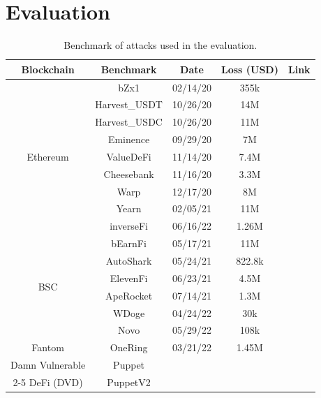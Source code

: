 


\chapter{Evaluation}
\label{sec:evaluation}



\begin{table}[h!]
    \caption{Benchmark of attacks used in the evaluation.}
    \vspace{-2mm}
    \centering
    \begin{tabular}{|c|c|c|c|c|}
    \hline
    Blockchain & Benchmark &  Date  & Loss (USD) & Link \\ \hline
    \multirow{9}{*}{Ethereum}  & bZx1 & 02/14/20 & 355k & \cite{bZx1} \\ \cline{2-5} 
                & Harvest\_USDT & 10/26/20 & 14M & \cite{HarvestUSDC} \\ \cline{2-5} 
                & Harvest\_USDC & 10/26/20 & 11M & \cite{HarvestUSDT}  \\ \cline{2-5} 
                & Eminence & 09/29/20 & 7M & \cite{Eminence} \\ \cline{2-5} 
                & ValueDeFi & 11/14/20 & 7.4M & \cite{ValueDeFi}\\ \cline{2-5} 
                & Cheesebank & 11/16/20 & 3.3M & \cite{Cheesebank} \\ \cline{2-5} 
                & Warp & 12/17/20 & 8M & \cite{Warp} \\ \cline{2-5} 
                & Yearn & 02/05/21 & 11M  & \cite{Yearn} \\ \cline{2-5} 
                & inverseFi & 06/16/22 & 1.26M  & \cite{inverseFi} \\ \hline
    \multirow{6}{*}{BSC}   & bEarnFi  & 05/17/21 & 11M & \cite{bEarnFi} \\ \cline{2-5} 
                           & AutoShark & 05/24/21 & 822.8k & \cite{AutoShark} \\ \cline{2-5}
                           & ElevenFi & 06/23/21 & 4.5M & \cite{ElevenFi} \\ \cline{2-5} 
                           & ApeRocket & 07/14/21 & 1.3M & \cite{ApeRocket} \\ \cline{2-5} 
                           & WDoge     & 04/24/22 & 30k  & \cite{WDoge} \\ \cline{2-5} 
                           & Novo      & 05/29/22 & 108k & \cite{Novo}  \\ \hline
    Fantom                 & OneRing   & 03/21/22 & 1.45M & \cite{OneRing} \\ \hline
    Damn Vulnerable  & Puppet   &  &  & \cite{DVD1} \\ \cline{2-5} 
    DeFi (DVD)       & PuppetV2 &  &  & \cite{DVD2} \\ \hline
    \end{tabular}
    \flushleft
    \label{tab:benchmark}
    \vspace{-5mm}
\end{table}





